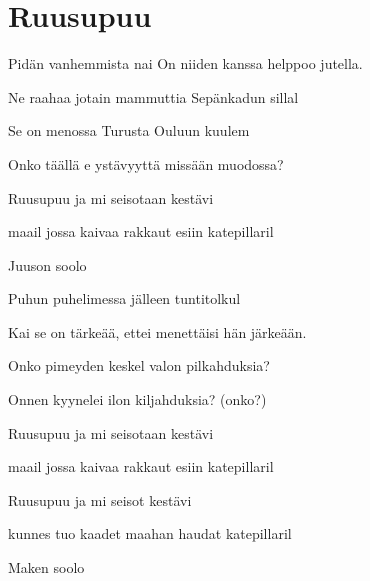 \documentclass[12pt,a4paper]{article}
\begin{document}
\thispagestyle{empty}
\section*{Ruusupuu}


\begin{SBVerse}
Pidän vanhemmista nai On niiden kanssa helppoo
jutella.

Ne raahaa jotain mammuttia Sepänkadun
sillal

Se on menossa Turusta Ouluun kuulem

Onko täällä e ystävyyttä missään muodossa?
\end{SBVerse}

\begin{SBChorus}
Ruusupuu ja mi 
seisotaan kestävi 

maail jossa kaivaa 
rakkaut esiin 
katepillaril

{\SBLyricNoteFont Juuson soolo}  
\end{SBChorus}

\begin{SBVerse}
Puhun puhelimessa jälleen tuntitolkul

Kai se on tärkeää, ettei menettäisi hän
järkeään.

Onko pimeyden keskel valon pilkahduksia?

Onnen kyynelei ilon kiljahduksia? (onko?)
\end{SBVerse}

\begin{SBChorus}
Ruusupuu ja mi 
seisotaan kestävi 

maail jossa kaivaa 
rakkaut esiin  katepillaril

Ruusupuu ja mi 
seisot kestävi 

kunnes  tuo kaadet 
maahan haudat
katepillaril

{\SBLyricNoteFont Maken soolo}
      
       
\end{SBChorus}

\end{document}
